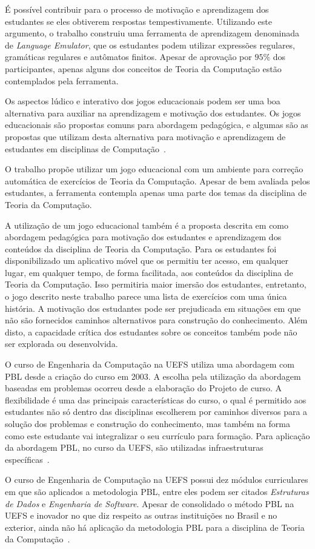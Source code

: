 É possível contribuir para o processo de
motivação e aprendizagem dos estudantes se
eles obtiverem respostas
tempestivamente.
Utilizando este argumento, o
trabalho  construiu
uma ferramenta de aprendizagem denominada
de \textit{Language Emulator}, que os estudantes
podem utilizar expressões regulares, gramáticas
regulares e autômatos finitos.
Apesar de aprovação por $95\%$ dos
participantes, apenas alguns dos conceitos de Teoria
da Computação estão contemplados pela ferramenta.

Os aspectos lúdico e interativo dos jogos educacionais
podem ser uma boa alternativa para auxiliar na aprendizagem
e motivação dos estudantes.
Os jogos educacionais são propostas comuns para abordagem
pedagógica, e algumas são as propostas que utilizam
desta alternativa para motivação e aprendizagem
de estudantes em disciplinas de Computação~\cite{silva2010automata}.

O trabalho  propõe utilizar
um jogo educacional com um ambiente para correção
automática de exercícios de Teoria da Computação.
Apesar de bem avaliada pelos estudantes, a ferramenta
contempla apenas uma parte dos temas da disciplina
de Teoria da Computação.

A utilização de um jogo educacional também é a
proposta descrita em 
como abordagem pedagógica para motivação dos estudantes
e aprendizagem dos conteúdos da disciplina de Teoria da
Computação.
Para os estudantes foi disponibilizado um aplicativo
móvel que os permitiu ter acesso, em qualquer lugar,
em qualquer tempo, de forma facilitada, aos conteúdos
da disciplina de Teoria da Computação.
Isso permitiria
maior imersão dos estudantes, entretanto, o jogo
descrito neste trabalho parece uma lista de
exercícios com uma única história.
A motivação dos estudantes pode ser prejudicada
em situações em que não são fornecidos caminhos
alternativos para construção do conhecimento.
Além disto, a capacidade crítica dos estudantes
sobre os conceitos também pode não ser explorada
ou desenvolvida.

O curso de Engenharia da Computação na
\ac{UEFS} utiliza uma abordagem com PBL desde a criação
do curso em 2003.
A escolha pela utilização da abordagem baseadas em
problemas ocorreu desde a elaboração do Projeto de curso.
A flexibilidade é uma das principais características do
curso, o qual é permitido aos estudantes não só dentro
das disciplinas escolherem por caminhos diversos
para a solução dos problemas e construção do conhecimento,
mas também na forma como este estudante vai integralizar
o seu currículo para formação.
Para aplicação da abordagem \ac{PBL}, no curso da \ac{UEFS},
são utilizadas infraestruturas
específicas~\cite{dos2007aplicaccao, bittencourt2003curriculo}.

O curso de Engenharia de Computação na \ac{UEFS}
possui dez módulos curriculares em que são
aplicados a metodologia PBL, entre eles podem ser citados
\textit{Estruturas de Dados} e
\textit{Engenharia de Software}.
Apesar de consolidado o método PBL na \ac{UEFS}
e inovador no que diz respeito as outras
instituições no Brasil e no exterior,
ainda não há aplicação da metodologia PBL para
a disciplina de Teoria da Computação~\cite{dospensamento}.
